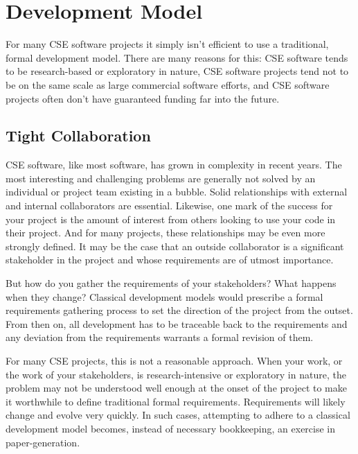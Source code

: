 \documentclass[12pt,relax]{article}
\begin{document}
\section{Development Model}
\label{Section:Development Model}

For many CSE software projects it simply isn't efficient to use a traditional, 
formal development model.  There are many reasons for this:  CSE software tends
to be research-based or exploratory in nature, CSE software projects tend not
to be on the same scale as large commercial software efforts, and CSE software 
projects often don't have guaranteed funding far into the future.

\subsection{Tight Collaboration}

CSE software, like most software, has grown in complexity in recent years.  The
most interesting and challenging problems are generally not solved by an
individual or project team existing in a bubble.  Solid relationships with 
external and internal collaborators are essential.  Likewise, one mark of the 
success for your project is the
amount of interest from others looking to use your code in their project.
And for many projects, these relationships may be even more strongly defined.
It may be the case that an outside collaborator is a significant stakeholder in
the project and whose requirements are of utmost importance.

But how do you gather the requirements of your stakeholders?  What happens
when they change?  Classical development models would prescribe a formal
requirements gathering process to set the direction of the project from the
outset.  From then on, all development has to be traceable back to the
requirements and any deviation from the requirements warrants a formal revision
of them.  

For many CSE projects, this is not a reasonable approach.  When your work, or 
the work of your stakeholders, is research-intensive or exploratory in nature, 
the problem may not be understood well enough at the onset of the project to 
make it worthwhile to define traditional formal 
requirements.  Requirements will likely change and evolve very quickly.  
In such cases, attempting to adhere to a classical
development model becomes, instead of necessary bookkeeping, an exercise in 
paper-generation.
\end{document}
